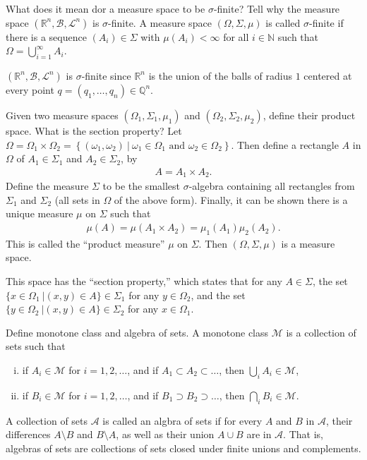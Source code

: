 \documentclass[avery5388,grid,frame]{flashcards}
\def\Rl{\mathbb{R}}
\begin{document}
\begin{flashcard}
    {What does it mean dor a measure space to be $\sigma$-finite?  Tell why the measure space $(\Rl^n, \mathcal{B}, \mathcal{L}^n)$ is $\sigma$-finite.}
    A measure space $(\Omega, \Sigma, \mu)$ is called $\sigma$-finite if there is a sequence $(A_i) \in \Sigma$ with $\mu(A_i) < \infty$ for all $i \in \mathbb{N}$ such that $\Omega = \bigcup_{i=1}^\infty A_i$.

    $(\Rl^n, \mathcal{B}, \mathcal{L}^n)$ is $\sigma$-finite since $\Rl^n$ is the union of the balls of radius $1$ centered at every point $q = (q_1, \dots, q_n) \in \mathbb{Q}^n$.
\end{flashcard}

\begin{flashcard}
    {Given two measure spaces $(\Omega_1, \Sigma_1, \mu_1)$ and $(\Omega_2, \Sigma_2, \mu_2)$, define their product space.  What is the section property?}
    Let $\Omega = \Omega_1 \times \Omega_2 = \left\{(\omega_1, \omega_2)\ |\ \omega_1 \in \Omega_1 \text{ and } \omega_2 \in \Omega_2\right\}$.  Then define a rectangle $A$ in $\Omega$ of $A_1 \in \Sigma_1$ and $A_2 \in \Sigma_2$, by
    \begin{align*}
        A = A_1 \times A_2.
    \end{align*}
    Define the measure $\Sigma$ to be the smallest $\sigma$-algebra containing all rectangles from $\Sigma_1$ and $\Sigma_2$ (all sets in $\Omega$ of the above form).  Finally, it can be shown there is a unique measure $\mu$ on $\Sigma$ such that
    \begin{align*}
        \mu(A) = \mu(A_1 \times A_2) = \mu_1(A_1)\mu_2(A_2).
    \end{align*}
    This is called the ``product measure'' $\mu$ on $\Sigma$.  Then $(\Omega, \Sigma, \mu)$ is a measure space.

    This space has the ``section property,'' which states that for any $A \in \Sigma$, the set $\{x \in \Omega_1\ | (x,y) \in A\} \in \Sigma_1$ for any $y \in \Omega_2$, and the set $\{y \in \Omega_2\ | (x,y) \in A\} \in \Sigma_2$ for any $x \in \Omega_1$.
\end{flashcard}

\begin{flashcard}
    {Define monotone class and algebra of sets.}
    A monotone class $\mathcal{M}$ is a collection of sets such that
    \begin{enumerate}[(i)]
        \item if $A_i \in \mathcal{M}$ for $i = 1,2,\dots$, and if $A_1 \subset A_2 \subset \dots$, then $\bigcup_i A_i \in \mathcal{M}$,
        \item if $B_i \in \mathcal{M}$ for $i = 1,2,\dots$, and if $B_1 \supset B_2 \supset \dots$, then $\bigcap_i B_i \in \mathcal{M}$.
    \end{enumerate}

    A collection of sets $\mathcal{A}$ is called an algbra of sets if for every $A$ and $B$ in $\mathcal{A}$, their differences $A \setminus B$ and $B \setminus A$, as well as their union $A \cup B$ are in $\mathcal{A}$.  That is, algebras of sets are collections of sets closed under finite unions and complements.
\end{flashcard}
\end{document}
